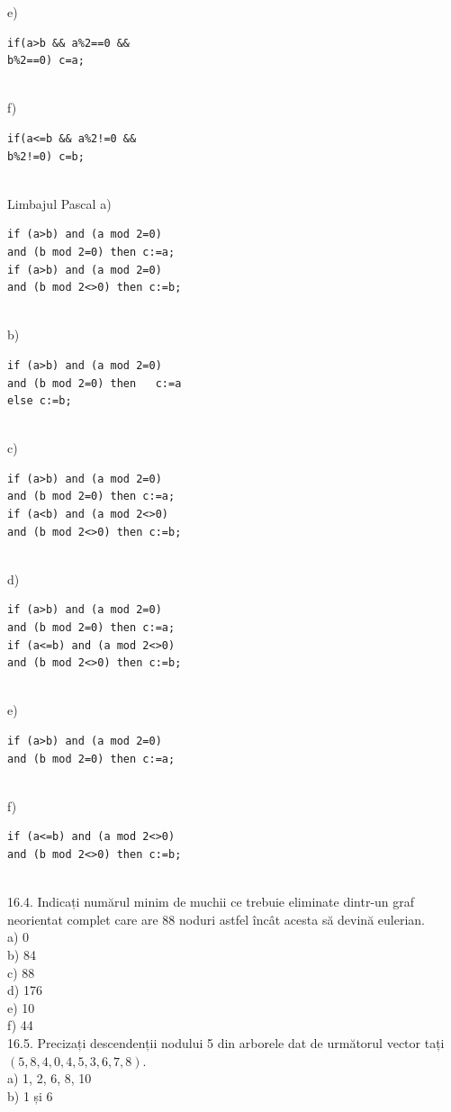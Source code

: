 {{e) \begin{verbatim}
if(a>b && a%2==0 && 
b%2==0) c=a;
\end{verbatim}
\\
f) \begin{verbatim}
if(a<=b && a%2!=0 && 
b%2!=0) c=b;
\end{verbatim}
\\
Limbajul Pascal
a) \begin{verbatim}
if (a>b) and (a mod 2=0) 
and (b mod 2=0) then c:=a; 
if (a>b) and (a mod 2=0) 
and (b mod 2<>0) then c:=b;
\end{verbatim}
\\
b) \begin{verbatim}
if (a>b) and (a mod 2=0) 
and (b mod 2=0) then   c:=a  
else c:=b; 
\end{verbatim}
\\
c) \begin{verbatim}
if (a>b) and (a mod 2=0) 
and (b mod 2=0) then c:=a; 
if (a<b) and (a mod 2<>0) 
and (b mod 2<>0) then c:=b;
\end{verbatim}
\\
d) \begin{verbatim}
if (a>b) and (a mod 2=0) 
and (b mod 2=0) then c:=a; 
if (a<=b) and (a mod 2<>0) 
and (b mod 2<>0) then c:=b;
\end{verbatim}
\\
e) \begin{verbatim}
if (a>b) and (a mod 2=0) 
and (b mod 2=0) then c:=a;
\end{verbatim}
\\
f) \begin{verbatim}
if (a<=b) and (a mod 2<>0) 
and (b mod 2<>0) then c:=b;
\end{verbatim}
\\
16.4. Indicați numărul minim de muchii ce trebuie eliminate dintr-un graf neorientat complet care are 88 noduri astfel încât acesta să devină eulerian.
\\
a) 0
\\
b) 84
\\
c) 88
\\
d) 176
\\
e) 10
\\
f) 44
\\
16.5. Precizați descendenții nodului 5 din arborele dat de următorul vector tați $(5,8,4,0,4,5,3,6,7,8)$.
\\
a) 1, 2, 6, 8, 10
\\
b) 1 și 6
\\
}}
